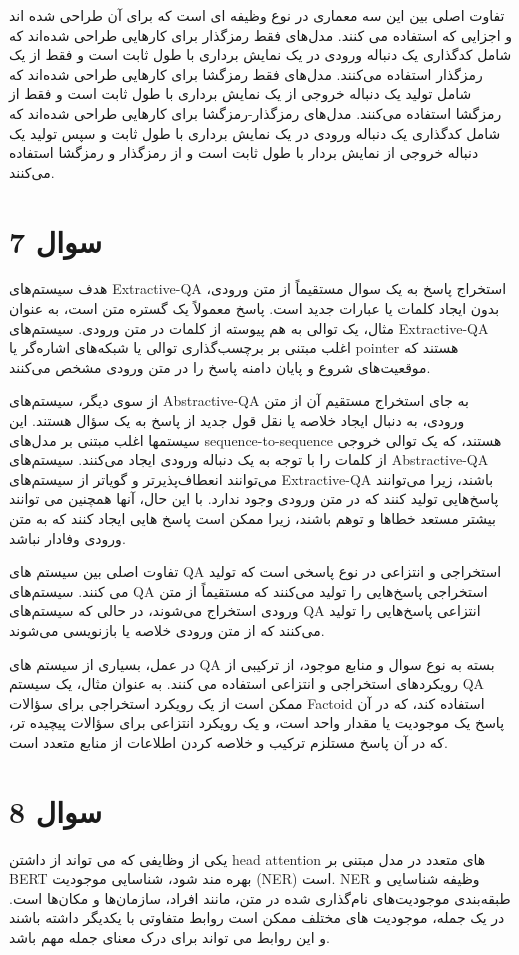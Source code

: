 \documentclass{article}
\begin{document}
تفاوت اصلی بین این سه معماری در نوع وظیفه ای است که برای آن طراحی شده اند و اجزایی که استفاده می کنند. مدل‌های فقط رمزگذار برای کارهایی طراحی شده‌اند که شامل کدگذاری یک دنباله ورودی در یک نمایش برداری با طول ثابت است و فقط از یک رمزگذار استفاده می‌کنند. مدل‌های فقط رمزگشا برای کارهایی طراحی شده‌اند که شامل تولید یک دنباله خروجی از یک نمایش برداری با طول ثابت است و فقط از رمزگشا استفاده می‌کنند. مدل‌های رمزگذار-رمزگشا برای کارهایی طراحی شده‌اند که شامل کدگذاری یک دنباله ورودی در یک نمایش برداری با طول ثابت و سپس تولید یک دنباله خروجی از نمایش بردار با طول ثابت است و از رمزگذار و رمزگشا استفاده می‌کنند. 

\section*{سوال 7}
هدف سیستم‌های Extractive-QA استخراج پاسخ به یک سوال مستقیماً از متن ورودی، بدون ایجاد کلمات یا عبارات جدید است. پاسخ معمولاً یک گستره متن است، به عنوان مثال، یک توالی به هم پیوسته از کلمات در متن ورودی. سیستم‌های Extractive-QA اغلب مبتنی بر برچسب‌گذاری توالی یا شبکه‌های اشاره‌گر یا pointer هستند که موقعیت‌های شروع و پایان دامنه پاسخ را در متن ورودی مشخص می‌کنند.

از سوی دیگر، سیستم‌های Abstractive-QA به جای استخراج مستقیم آن از متن ورودی، به دنبال ایجاد خلاصه یا نقل قول جدید از پاسخ به یک سؤال هستند. این سیستمها اغلب مبتنی بر مدل‌های sequence-to-sequence هستند، که یک توالی خروجی از کلمات را با توجه به یک دنباله ورودی ایجاد می‌کنند. سیستم‌های Abstractive-QA می‌توانند انعطاف‌پذیرتر و گویاتر از سیستم‌های  Extractive-QA باشند، زیرا می‌توانند پاسخ‌هایی تولید کنند که در متن ورودی وجود ندارد. با این حال، آنها همچنین می توانند بیشتر مستعد خطاها و توهم باشند، زیرا ممکن است پاسخ هایی ایجاد کنند که به متن ورودی وفادار نباشد.

تفاوت اصلی بین سیستم های QA استخراجی و انتزاعی در نوع پاسخی است که تولید می کنند. سیستم‌های QA استخراجی پاسخ‌هایی را تولید می‌کنند که مستقیماً از متن ورودی استخراج می‌شوند، در حالی که سیستم‌های QA انتزاعی پاسخ‌هایی را تولید می‌کنند که از متن ورودی خلاصه یا بازنویسی می‌شوند.

در عمل، بسیاری از سیستم های QA بسته به نوع سوال و منابع موجود، از ترکیبی از رویکردهای استخراجی و انتزاعی استفاده می کنند. به عنوان مثال، یک سیستم QA ممکن است از یک رویکرد استخراجی برای سؤالات Factoid استفاده کند، که در آن پاسخ یک موجودیت یا مقدار واحد است، و یک رویکرد انتزاعی برای سؤالات پیچیده تر، که در آن پاسخ مستلزم ترکیب و خلاصه کردن اطلاعات از منابع متعدد است.

\section*{سوال 8}
یکی از وظایفی که می تواند از داشتن head attention های متعدد در مدل مبتنی بر BERT بهره مند شود، شناسایی موجودیت (NER) است. NER وظیفه شناسایی و طبقه‌بندی موجودیت‌های نام‌گذاری شده در متن، مانند افراد، سازمان‌ها و مکان‌ها است. در یک جمله، موجودیت های مختلف ممکن است روابط متفاوتی با یکدیگر داشته باشند و این روابط می تواند برای درک معنای جمله مهم باشد.
\end{document}
